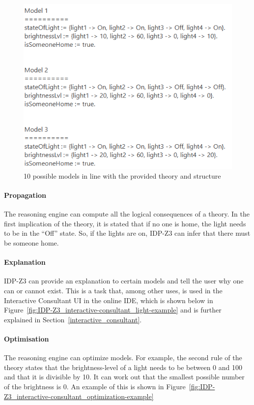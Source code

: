 \documentclass[11pt,a4paper]{report}
\begin{document}
\begin{figure}
    \centering
    \includegraphics[width=0.8\linewidth]{images/IDP-Z3_model-generation.png}
    \caption{10 possible models in line with the provided theory and structure}
    \label{fig:IDP-Z3_model-generation}
\end{figure}

\paragraph{Propagation}
The reasoning engine can compute all the logical consequences of a theory. In the first implication of the theory, it is stated that if no one is home, the light needs to be in the ``Off'' state. So, if the lights are on, IDP-Z3 can infer that there must be someone home.

\paragraph{Explanation}
IDP-Z3 can provide an explanation to certain models and tell the user why one can or cannot exist. This is a task that, among other uses, is used in the Interactive Consultant UI in the online IDE, which is shown below in Figure~\ref{fig:IDP-Z3_interactive-consultant_light-example} and is further explained in Section~\ref{interactive_consultant}.

\paragraph{Optimisation}
The reasoning engine can optimize models. For example, the second rule of the theory states that the brightness-level of a light needs to be between 0 and 100 and that it is divisible by 10. It can work out that the smallest possible number of the brightness is 0. An example of this is shown in Figure~\ref{fig:IDP-Z3_interactive-consultant_optimization-example}
\end{document}
